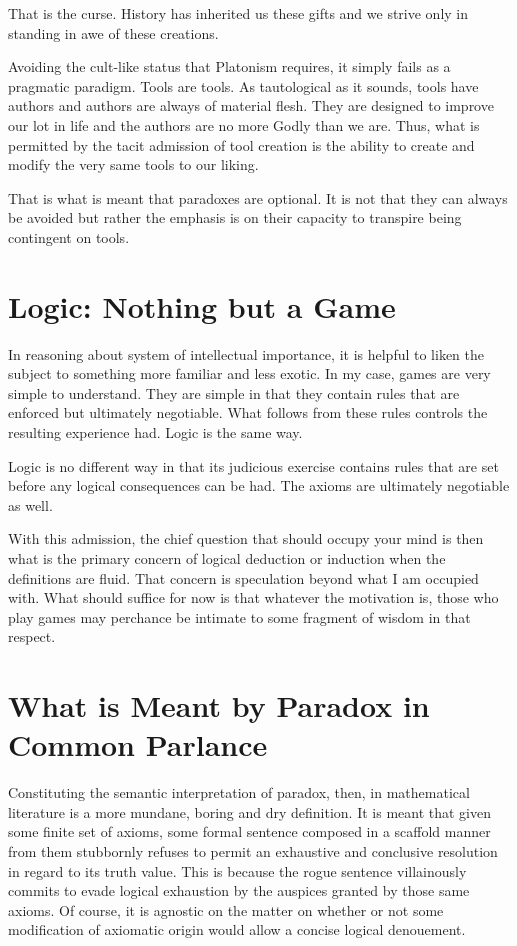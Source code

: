 \documentclass[11pt]{article}
\begin{document}
That is the curse. History has inherited us these gifts and we strive only in
standing in awe of these creations.

Avoiding the cult-like status that Platonism requires, it simply fails as a
pragmatic paradigm. Tools are tools. As tautological as it sounds, tools have
authors and authors are always of material flesh. They are designed to improve
our lot in life and the authors are no more Godly than we are. Thus, what is
permitted by the tacit admission of tool creation is the ability to create and
modify the very same tools to our liking.

That is what is meant that paradoxes are optional. It is not that they can
always be avoided but rather the emphasis is on their capacity to transpire
being contingent on tools.

\section{Logic: Nothing but a Game}
\label{sec:org8fb6286}

In reasoning about system of intellectual importance, it is helpful to liken
the subject to something more familiar and less exotic. In my case, games are
very simple to understand. They are simple in that they contain rules that are
enforced but ultimately negotiable. What follows from these rules controls the
resulting experience had. Logic is the same way.

Logic is no different way in that its judicious exercise contains rules that
are set before any logical consequences can be had. The axioms are ultimately
negotiable as well.

With this admission, the chief question that should occupy your mind is then
what is the primary concern of logical deduction or induction when the
definitions are fluid. That concern is speculation beyond what I am occupied
with. What should suffice for now is that whatever the motivation is, those
who play games may perchance be intimate to some fragment of wisdom in that
respect.

\section{What is Meant by Paradox in Common Parlance}
\label{sec:org15bb422}

Constituting the semantic interpretation of paradox, then, in mathematical
literature is a more mundane, boring and dry definition. It is meant that
given some finite set of axioms, some formal sentence composed in a scaffold
manner from them stubbornly refuses to permit an exhaustive and conclusive
resolution in regard to its truth value. This is because the rogue sentence
villainously commits to evade logical exhaustion by the auspices granted by
those same axioms. Of course, it is agnostic on the matter on whether or not
some modification of axiomatic origin would allow a concise logical
denouement.
\end{document}
